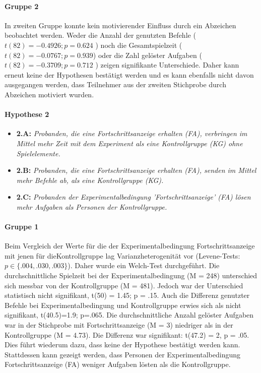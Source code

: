 \paragraph{Gruppe 2}
In zweiten Gruppe konnte kein motivierender Einfluss durch ein Abzeichen beobachtet werden. Weder die Anzahl der genutzten Befehle ( $ t(82)=-0.4926; p=0.624 $ ) noch die Gesamtspielzeit ($t(82)=-0.0767; p=0.939$) oder die Zahl gelöster Aufgaben ( $t(82)=-0.3709; p=0.712$ ) zeigen signifikante Unterschiede. Daher kann erneut keine der Hypothesen bestätigt werden und es kann ebenfalls nicht davon ausgegangen werden, dass Teilnehmer aus der zweiten Stichprobe durch Abzeichen motiviert wurden. 


\paragraph{Hypothese 2}
\begin{itemize}
    \item \textbf{2.A:} \textit{Probanden, die eine Fortschrittsanzeige erhalten (FA), verbringen im Mittel mehr Zeit mit dem Experiment als eine Kontrollgruppe (KG) ohne Spielelemente.}
    \item \textbf{2.B:} \textit{Probanden, die eine Fortschrittsanzeige erhalten (FA), senden im Mittel mehr Befehle ab, als eine Kontrollgruppe (KG).}
    \item \textbf{2.C:} \textit{Probanden der Experimentalbedingung 'Fortschrittsanzeige' (FA) lösen mehr Aufgaben als Personen der Kontrollgruppe.} 
\end{itemize}

\paragraph{Gruppe 1}
Beim Vergleich der Werte für die der Experimentalbedingung Fortschrittsanzeige mit jenen für dieKontrollgruppe lag Varianzheterogenität vor (Levene-Tests: $p\in\{.004, .030, .003\}$). Daher wurde ein Welch-Test durchgeführt. Die durchschnittliche Spielzeit bei der Experimentalbedingung (M = 248) unterschied sich messbar von der Kontrollgruppe (M = 481). Jedoch war der Unterschied statistisch nicht signifikant, t(50) = 1.45; p = .15. Auch die Differenz genutzter Befehle bei Experimentalbedingung und Kontrollgruppe erwies sich als nicht signifikant, t(40.5)=1.9; p=.065. Die durchschnittliche Anzahl gelöster Aufgaben war in der Stichprobe mit Fortschrittsanzeige (M = 3) niedriger als in der Kontrollgruppe (M = 4.73). Die Differenz war signifikant: t(47.2) = 2, p = .05. Dies führt wiederum dazu, dass keine der Hypothese bestätigt werden kann. Stattdessen kann gezeigt werden, dass Personen der Experimentalbedingung Fortschrittsanzeige (FA) weniger Aufgaben lösten als die Kontrollgruppe. 


